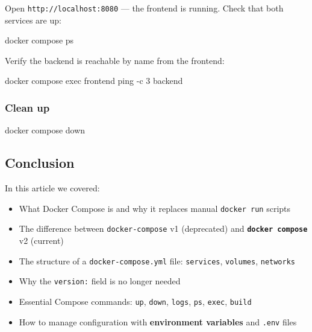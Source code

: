 \documentclass[11pt,american,a4paper,openany]{book}
\providecommand{\tightlist}{%
  \setlength{\itemsep}{2pt}\setlength{\parskip}{0pt}}
\newenvironment{Shaded}{}{}
\newcommand{\NormalTok}[1]{#1}
\begin{document}
Open \texttt{http://localhost:8080} --- the frontend is running. Check
that both services are up:

\begin{Shaded}
\begin{Highlighting}[]
\NormalTok{docker compose ps}
\end{Highlighting}
\end{Shaded}

Verify the backend is reachable by name from the frontend:

\begin{Shaded}
\begin{Highlighting}[]
\NormalTok{docker compose exec frontend ping {-}c 3 backend}
\end{Highlighting}
\end{Shaded}

\subsubsection{Clean up}\label{clean-up-2}

\begin{Shaded}
\begin{Highlighting}[]
\NormalTok{docker compose down}
\end{Highlighting}
\end{Shaded}

\subsection{Conclusion}\label{conclusion-5}

In this article we covered:

\begin{itemize}
\tightlist
\item
  What Docker Compose is and why it replaces manual \texttt{docker\ run}
  scripts
\item
  The difference between \texttt{docker-compose} v1 (deprecated) and
  \textbf{\texttt{docker\ compose}} v2 (current)
\item
  The structure of a \texttt{docker-compose.yml} file:
  \texttt{services}, \texttt{volumes}, \texttt{networks}
\item
  Why the \texttt{version:} field is no longer needed
\item
  Essential Compose commands: \texttt{up}, \texttt{down}, \texttt{logs},
  \texttt{ps}, \texttt{exec}, \texttt{build}
\item
  How to manage configuration with \textbf{environment variables} and
  \texttt{.env} files
\end{itemize}
\end{document}
